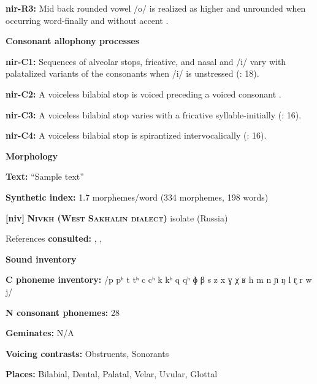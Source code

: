 \textbf{nir-R3:} Mid back rounded vowel /o/ is realized as higher and unrounded when occurring word-finally and without accent \citep[14]{Anceaux1965}.



\textbf{Consonant allophony processes}



\textbf{nir-C1:} Sequences of alveolar stops, fricative, and nasal and /i/ vary with palatalized variants of the consonants when /i/ is unstressed (\citealt{MayMay1981}: 18).



\textbf{nir-C2:} A voiceless bilabial stop is voiced preceding a voiced consonant \citep[30]{May1997}.



\textbf{nir-C3:} A voiceless bilabial stop varies with a fricative syllable-initially (\citealt{MayMay1981}: 16).



\textbf{nir-C4:} A voiceless bilabial stop is spirantized intervocalically (\citealt{MayMay1981}: 16).



\textbf{Morphology}



\textbf{Text:} “Sample text” \citep[172-177]{May1997}



\textbf{Synthetic index:} 1.7 morphemes/word (334 morphemes, 198 words)



\textbf{[niv]}   \textbf{\textsc{Nivkh (West Sakhalin dialect)}}  isolate (Russia)



References \textbf{consulted:} \citet{Gruzdeva1998}, \citet{Kreinovich1979}, \citet{Shiraishi2006}



\textbf{Sound inventory}



\textbf{C phoneme inventory:} /p pʰ t tʰ c cʰ k kʰ q qʰ ɸ β s z x ɣ χ ʁ h m n ɲ ŋ l r̥ r w j/



\textbf{N consonant phonemes:} 28



\textbf{Geminates:} N/A



\textbf{Voicing contrasts:} Obstruents, Sonorants



\textbf{Places:} Bilabial, Dental, Palatal, Velar, Uvular, Glottal




